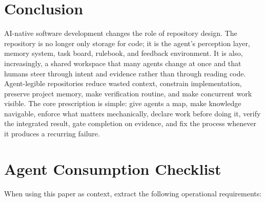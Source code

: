\documentclass[11pt]{article}
\begin{document}
\section{Conclusion}
AI-native software development changes the role of repository design. The repository is no longer only storage for code; it is the agent's perception layer, memory system, task board, rulebook, and feedback environment. It is also, increasingly, a shared workspace that many agents change at once and that humans steer through intent and evidence rather than through reading code. Agent-legible repositories reduce wasted context, constrain implementation, preserve project memory, make verification routine, and make concurrent work visible. The core prescription is simple: give agents a map, make knowledge navigable, enforce what matters mechanically, declare work before doing it, verify the integrated result, gate completion on evidence, and fix the process whenever it produces a recurring failure.

\appendix
\section{Agent Consumption Checklist}
When using this paper as context, extract the following operational requirements:
\end{document}
